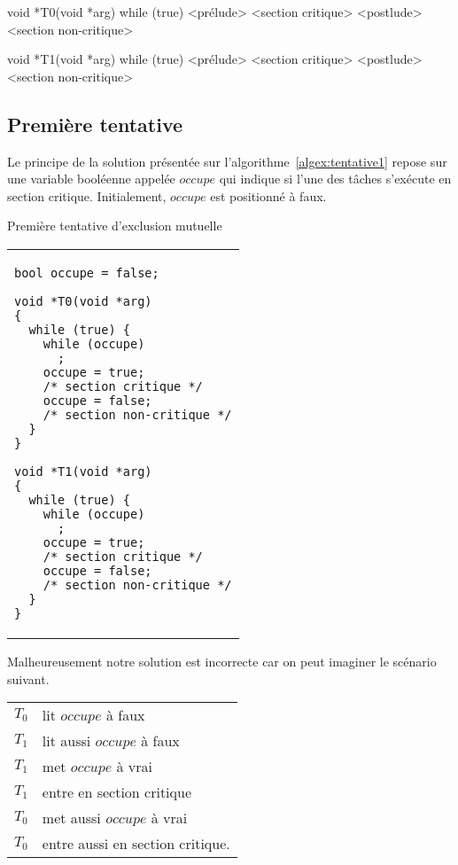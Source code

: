 \label{algex:générale}
\begin{codeblock}[list text={Schéma général des algorithmes d'exclusion mutuelle},title={Schéma général des algorithmes d'exclusion mutuelle}]
void *T0(void *arg)
{
  while (true) {
    <prélude>
    <section critique>
    <postlude>
    <section non-critique>
  }
}

void *T1(void *arg)
{
  while (true) {
    <prélude>
    <section critique>
    <postlude>
    <section non-critique>
  }
}
\end{codeblock}

\subsection*{Première tentative}
Le principe de la solution présentée sur l'algorithme~\ref{algex:tentative1} repose sur une variable booléenne appelée $occupe$ qui indique si l'une des tâches s'exécute en section critique.
Initialement, $occupe$ est positionné à faux.

\begin{algorithm}[!ht]
  \caption{Première tentative d'exclusion mutuelle}\label{algex:tentative1}
  \centering
  \begin{tabular}{l}
    \lstset{language=C++}
    \begin{lstlisting}
bool occupe = false;

void *T0(void *arg)
{
  while (true) {
    while (occupe)
      ;
    occupe = true;
    /* section critique */
    occupe = false;
    /* section non-critique */
  }
}

void *T1(void *arg)
{
  while (true) {
    while (occupe)
      ;
    occupe = true;
    /* section critique */
    occupe = false;
    /* section non-critique */
  }
}
\end{lstlisting}
  \end{tabular}

\end{algorithm}

Malheureusement notre solution est incorrecte car on peut imaginer le scénario suivant.
\begin{center}
  \begin{tabular}{cl}
    $T_0$ & lit $occupe$ à faux              \\
    $T_1$ & lit aussi $occupe$ à faux        \\
    $T_1$ & met $occupe$ à vrai              \\
    $T_1$ & entre en section critique        \\
    $T_0$ & met aussi $occupe$ à vrai        \\
    $T_0$ & entre aussi en section critique. \\
  \end{tabular}
\end{center}

